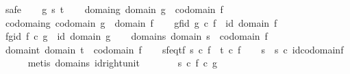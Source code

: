 \begin{isabellebody}
\isamarkupfalse%
\ safe\isanewline
\ \ \isamarkupfalse%
\ g\ s\ t\isanewline
\ \ \isamarkupfalse%
\ domain{\isacharunderscore}{\kern0pt}g{\isacharcolon}{\kern0pt}\ {\isachardoublequoteopen}domain\ g\ {\isacharequal}{\kern0pt}\ codomain\ f{\isachardoublequoteclose}\isanewline
\ \ \isamarkupfalse%
\ codomain{\isacharunderscore}{\kern0pt}g{\isacharcolon}{\kern0pt}\ {\isachardoublequoteopen}codomain\ g\ {\isacharequal}{\kern0pt}\ domain\ f{\isachardoublequoteclose}\isanewline
\ \ \isamarkupfalse%
\ gf{\isacharunderscore}{\kern0pt}id{\isacharcolon}{\kern0pt}\ {\isachardoublequoteopen}g\ {\isasymcirc}\isactrlsub c\ f\ {\isacharequal}{\kern0pt}\ id\ {\isacharparenleft}{\kern0pt}domain\ f{\isacharparenright}{\kern0pt}{\isachardoublequoteclose}\isanewline
\ \ \isamarkupfalse%
\ fg{\isacharunderscore}{\kern0pt}id{\isacharcolon}{\kern0pt}\ {\isachardoublequoteopen}f\ {\isasymcirc}\isactrlsub c\ g\ {\isacharequal}{\kern0pt}\ id\ {\isacharparenleft}{\kern0pt}domain\ g{\isacharparenright}{\kern0pt}{\isachardoublequoteclose}\isanewline
\ \ \isamarkupfalse%
\ domain{\isacharunderscore}{\kern0pt}s{\isacharcolon}{\kern0pt}\ {\isachardoublequoteopen}domain\ s\ {\isacharequal}{\kern0pt}\ codomain\ f{\isachardoublequoteclose}\isanewline
\ \ \isamarkupfalse%
\ domain{\isacharunderscore}{\kern0pt}t{\isacharcolon}{\kern0pt}\ {\isachardoublequoteopen}domain\ t\ {\isacharequal}{\kern0pt}\ codomain\ f{\isachardoublequoteclose}\isanewline
\ \ \isamarkupfalse%
\ sf{\isacharunderscore}{\kern0pt}eq{\isacharunderscore}{\kern0pt}tf{\isacharcolon}{\kern0pt}\ {\isachardoublequoteopen}s\ {\isasymcirc}\isactrlsub c\ f\ {\isacharequal}{\kern0pt}\ t\ {\isasymcirc}\isactrlsub c\ f{\isachardoublequoteclose}\isanewline
\isanewline
\ \ \isamarkupfalse%
\ {\isachardoublequoteopen}s\ {\isacharequal}{\kern0pt}\ s\ {\isasymcirc}\isactrlsub c\ id{\isacharparenleft}{\kern0pt}codomain{\isacharparenleft}{\kern0pt}f{\isacharparenright}{\kern0pt}{\isacharparenright}{\kern0pt}{\isachardoublequoteclose}\isanewline
\ \ \ \ \isamarkupfalse%
\ {\isacharparenleft}{\kern0pt}metis\ domain{\isacharunderscore}{\kern0pt}s\ id{\isacharunderscore}{\kern0pt}right{\isacharunderscore}{\kern0pt}unit{\isacharparenright}{\kern0pt}\isanewline
\ \ \isamarkupfalse%
\ \isamarkupfalse%
\ {\isachardoublequoteopen}{\isachardot}{\kern0pt}{\isachardot}{\kern0pt}{\isachardot}{\kern0pt}\ {\isacharequal}{\kern0pt}\ s\ {\isasymcirc}\isactrlsub c\ {\isacharparenleft}{\kern0pt}f\ {\isasymcirc}\isactrlsub c\ g{\isacharparenright}{\kern0pt}{\isachardoublequoteclose}\isanewline

\end{isabellebody}

